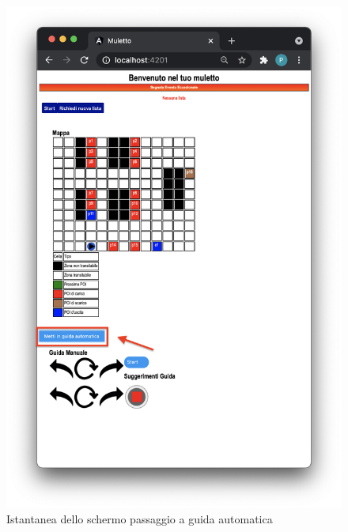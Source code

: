 \begin{figure}[H]
    \centering
    \includegraphics[scale=0.45]{res/images/forklift_cambioautomatica.png}
    \caption{Istantanea dello schermo passaggio a guida automatica}
\end{figure}
\pagebreak

